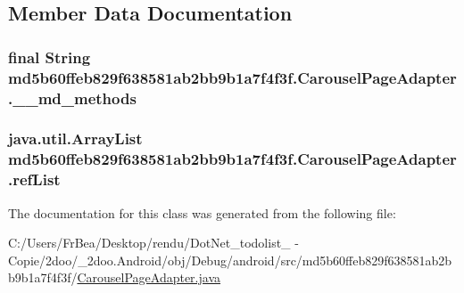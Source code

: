 \subsection{Member Data Documentation}
\hypertarget{classmd5b60ffeb829f638581ab2bb9b1a7f4f3f_1_1_carousel_page_adapter_af2a268eb1b8b79578e2ee7590f20521}{
\subsubsection[{\_\-\_\-md\_\-methods}]{\setlength{\rightskip}{0pt plus 5cm}final String {\bf md5b60ffeb829f638581ab2bb9b1a7f4f3f.CarouselPageAdapter.\_\-\_\-md\_\-methods}}}
\label{classmd5b60ffeb829f638581ab2bb9b1a7f4f3f_1_1_carousel_page_adapter_af2a268eb1b8b79578e2ee7590f20521}


\hypertarget{classmd5b60ffeb829f638581ab2bb9b1a7f4f3f_1_1_carousel_page_adapter_a22f5798ddaa23eeeb67082001d53a19}{
\subsubsection[{refList}]{\setlength{\rightskip}{0pt plus 5cm}java.util.ArrayList {\bf md5b60ffeb829f638581ab2bb9b1a7f4f3f.CarouselPageAdapter.refList}}}
\label{classmd5b60ffeb829f638581ab2bb9b1a7f4f3f_1_1_carousel_page_adapter_a22f5798ddaa23eeeb67082001d53a19}




The documentation for this class was generated from the following file:\begin{CompactItemize}
\item 
C:/Users/FrBea/Desktop/rendu/DotNet\_\-todolist\_ - Copie/2doo/\_\-2doo.Android/obj/Debug/android/src/md5b60ffeb829f638581ab2bb9b1a7f4f3f/\hyperlink{_carousel_page_adapter_8java}{CarouselPageAdapter.java}\end{CompactItemize}
